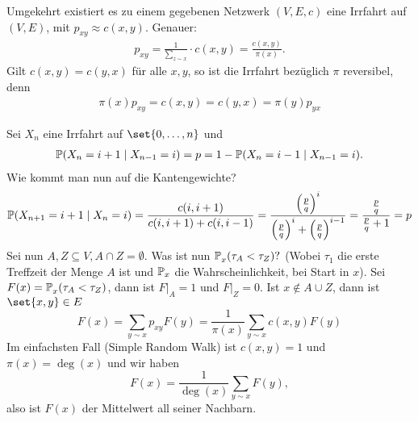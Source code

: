Umgekehrt existiert es zu einem gegebenen Netzwerk $(V,E,c)$ eine Irrfahrt auf $(V,E)$, mit $p_{xy} \approx c(x,y)$. Genauer: 
\begin{gather}	
p_{xy} = \frac{1}{\sum\limits_{z \sim x}} \cdot c(x,y) = \frac{c(x,y)}{\pi(x)}.
\end{gather}
Gilt $c(x,y) = c(y,x)$ für alle $x,y$, so ist die Irrfahrt bezüglich $\pi$ reversibel, denn 
\begin{gather}
	\pi(x)p_{xy} = c(x,y) = c(y,x) = \pi(y)p_{yx} 
\end{gather}

\begin{beispiel}
	\label{bsp:GamblersRun}
	Sei $X_n$ eine Irrfahrt auf $\set{0, \dots, n}$ und	
	\begin{gather}
		\prop{X_n = i+1 \given X_{n-1} = i} = p = 1 - \prop{X_n = i-1 \given X_{n-1} = i}.
	\end{gather}
	Wie kommt man nun auf die Kantengewichte?
	\begin{gather}
		\prop{X_{n+1} = i+1 \given X_n = i} = \frac{c(i,i+1)}{c(i,i+1)+c(i,i-1)} = \frac{\enb{\frac{p}{q}}^i}{\enb{\frac{p}{q}}^i + \enb{\frac{p}{q}}^{i-1}} = \frac{\frac{p}{q}}{\frac{p}{q} +1} = p
	\end{gather}
	Sei nun $A,Z \subseteq V, A \cap Z = \emptyset$. Was ist nun $\prop{\tau_A < \tau_Z}[][x]?$ (Wobei $\tau_1$ die erste Treffzeit der Menge $A$ ist und $\mathbb{P}_x$ die Wahrscheinlichkeit, bei Start in $x$). Sei $F(x) = \prop{\tau_A < \tau_Z}[][x]$, dann ist $F|_A = 1$ und $F|_Z = 0$. Ist $x \notin A \cup Z$, dann ist $\set{x,y} \in E$ 
	\begin{equation}
		F(x) = \sum\limits_{y \sim x} p_{xy} F(y) = \frac{1}{\pi(x)} \sum\limits_{y \sim x} c(x,y)F(y) \tag{*} \label{eqn:GamblersRun}
	\end{equation}
	Im einfachsten Fall (Simple Random Walk) ist $c(x,y) = 1$ und $\pi(x) = \deg(x)$  und wir haben
	\begin{equation}
		F(x) = \frac{1}{\deg(x)} \sum\limits_{y \sim x} F(y),
	\end{equation}
	also ist $F(x)$ der Mittelwert all seiner Nachbarn. 
\end{beispiel}

